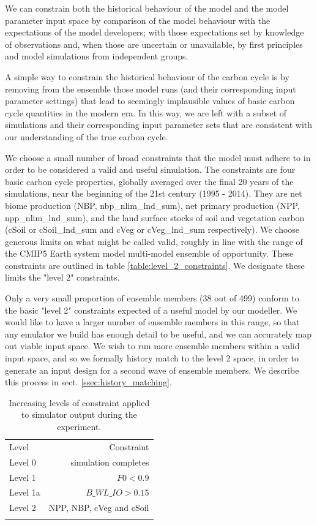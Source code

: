 \documentclass[gmd, manuscript]{copernicus}
\begin{document}
We can constrain both the historical behaviour of the model and the model parameter input space by comparison of the model behaviour with the expectations of the model developers; with those expectations set by knowledge of observations and, when those are uncertain or unavailable, by first principles and model simulations from independent groups. 

A simple way to constrain the historical behaviour of the carbon cycle is by removing from the ensemble those model runs (and their corresponding input parameter settings) that lead to seemingly implausible values of basic carbon cycle quantities in the modern era. In this way, we are left with a subset of simulations and their corresponding input parameter sets that are consistent with our  understanding of the true carbon cycle.

We choose a small number of broad constraints that the model must adhere to in order to be considered a valid and useful simulation. The constraints are four basic carbon cycle properties, globally averaged over the final 20 years of the simulations, near the beginning of the 21st century (1995 - 2014). They are net biome production (NBP, nbp\_nlim\_lnd\_sum), net primary production (NPP, npp\_nlim\_lnd\_sum), and the land surface stocks of soil and vegetation carbon (cSoil or cSoil\_lnd\_sum and cVeg or cVeg\_lnd\_sum respectively). We choose generous limits on what might be called valid, roughly in line with the range of the CMIP5 Earth system model multi-model ensemble of opportunity. These constraints are outlined in table \ref{table:level_2_constraints}. We designate these limits the "level 2" constraints.

Only a very small proportion of ensemble members (38 out of 499) conform to the basic "level 2" constraints expected of a useful model by our modeller. We would like to have a larger number of ensemble members in this range, so that any emulator we build has enough detail to be useful, and we can accurately map out viable input space. We wish to run more ensemble members within a valid input space, and so we formally history match to the level 2 space, in order to generate an input design for a second wave of ensemble members. We describe this process in sect. \ref{ssec:history_matching}.

\begin{table}[t]
\caption{Increasing levels of constraint applied to simulator output during the experiment.}
\label{table:levels_of_constraint}
\begin{tabular}{l r}
\tophline
Level & Constraint  \\ 
\middlehline
Level 0  & simulation completes \\
Level 1 & $F0 < 0.9$ \\
Level 1a & $B\_WL\_IO > 0.15 $ \\ 
Level 2  & NPP, NBP, cVeg and cSoil \\

\bottomhline
\end{tabular}
\belowtable{} %

\end{table}
\end{document}
